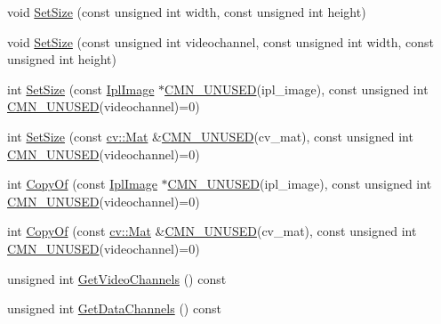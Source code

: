 \begin{DoxyCompactItemize}
\item 
void \hyperlink{classsvl_sample_image_custom_afd5680235e119e25aaa963ded5c48eaf}{Set\-Size} (const unsigned int width, const unsigned int height)
\item 
void \hyperlink{classsvl_sample_image_custom_a9f5e5b51372a642bb86b7f3a7ca18fac}{Set\-Size} (const unsigned int videochannel, const unsigned int width, const unsigned int height)
\item 
int \hyperlink{classsvl_sample_image_custom_a2cd2ed04b703eba1236882f90b17ae4a}{Set\-Size} (const \hyperlink{svl_types_8h_aa5a40a13021ba9708bfe921e18fdfa53}{Ipl\-Image} $\ast$\hyperlink{cmn_portability_8h_a021894e2626935fa2305434b1e893ff6}{C\-M\-N\-\_\-\-U\-N\-U\-S\-E\-D}(ipl\-\_\-image), const unsigned int \hyperlink{cmn_portability_8h_a021894e2626935fa2305434b1e893ff6}{C\-M\-N\-\_\-\-U\-N\-U\-S\-E\-D}(videochannel)=0)
\item 
int \hyperlink{classsvl_sample_image_custom_a5a87a82a4bf459e59489dded77e8d77a}{Set\-Size} (const \hyperlink{namespacecv_a60d81b54f4914bec4cc4a72ab77eb444}{cv\-::\-Mat} \&\hyperlink{cmn_portability_8h_a021894e2626935fa2305434b1e893ff6}{C\-M\-N\-\_\-\-U\-N\-U\-S\-E\-D}(cv\-\_\-mat), const unsigned int \hyperlink{cmn_portability_8h_a021894e2626935fa2305434b1e893ff6}{C\-M\-N\-\_\-\-U\-N\-U\-S\-E\-D}(videochannel)=0)
\item 
int \hyperlink{classsvl_sample_image_custom_a0a34cb5050fce85e6763eb7b01fa6a88}{Copy\-Of} (const \hyperlink{svl_types_8h_aa5a40a13021ba9708bfe921e18fdfa53}{Ipl\-Image} $\ast$\hyperlink{cmn_portability_8h_a021894e2626935fa2305434b1e893ff6}{C\-M\-N\-\_\-\-U\-N\-U\-S\-E\-D}(ipl\-\_\-image), const unsigned int \hyperlink{cmn_portability_8h_a021894e2626935fa2305434b1e893ff6}{C\-M\-N\-\_\-\-U\-N\-U\-S\-E\-D}(videochannel)=0)
\item 
int \hyperlink{classsvl_sample_image_custom_a62ff5d6430467d3a35c47577bb8ecc14}{Copy\-Of} (const \hyperlink{namespacecv_a60d81b54f4914bec4cc4a72ab77eb444}{cv\-::\-Mat} \&\hyperlink{cmn_portability_8h_a021894e2626935fa2305434b1e893ff6}{C\-M\-N\-\_\-\-U\-N\-U\-S\-E\-D}(cv\-\_\-mat), const unsigned int \hyperlink{cmn_portability_8h_a021894e2626935fa2305434b1e893ff6}{C\-M\-N\-\_\-\-U\-N\-U\-S\-E\-D}(videochannel)=0)
\item 
unsigned int \hyperlink{classsvl_sample_image_custom_a5e9b96c832ad4af214cada505f859bc2}{Get\-Video\-Channels} () const 
\item 
unsigned int \hyperlink{classsvl_sample_image_custom_a69f356f71fb518bd1b624cf9bde82e01}{Get\-Data\-Channels} () const 

\end{DoxyCompactItemize}
